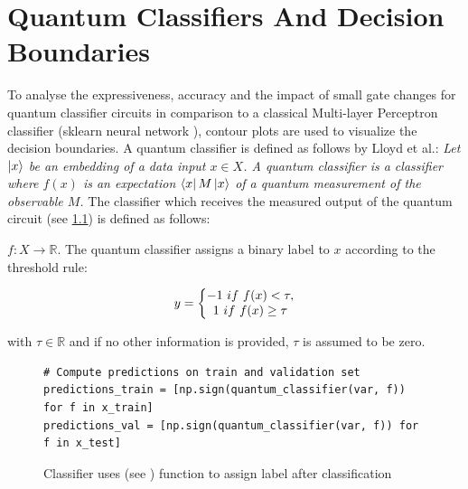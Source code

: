 
\chapter{Quantum Classifiers And Decision Boundaries} %

\label{chapter:quantum_classifiers_decision_boundaries}
To analyse the expressiveness, accuracy and the impact of small gate changes for quantum classifier circuits in comparison to a classical Multi-layer Perceptron classifier (sklearn neural network \href{https://scikit-learn.org/stable/modules/generated/sklearn.neural_network.MLPClassifier.html}{}), contour plots are used to visualize the decision boundaries. A quantum classifier is defined as follows by Lloyd et al.\cite{Quantum_embeddings_for_machine_learning_2020}: \textit{Let $\ket{x}$ be an embedding of a data input $x \in X$. A quantum classifier is a classifier where $f(x)$ is an expectation $\bra{x}M\ket{x}$ of a quantum measurement of the observable $M$.}
The classifier which receives the measured output of the quantum circuit (see \ref{fig:code_numpy_sign}) is defined as follows\cite{Quantum_embeddings_for_machine_learning_2020}:
\hfill \break

$f : X \rightarrow\mathbb{R}$. The quantum classifier assigns a binary label to $x$ according to the threshold rule:

\begin{equation}
    \centering
    \begin{split}
    y =
        \left\{\begin{matrix}
            -1\ if\ f(x) < \tau ,\\
            1\ if\ f(x) \geq \tau
        \end{matrix}\right.
    \end{split}
    \label{equation:classifier_definition}
\end{equation}

with $\tau\in\mathbb{R}$ and if no other information is provided, $\tau$ is assumed to be zero.\\
\hfill \break
\begin{figure}[h!]
    \centering
    \begin{verbatim}
# Compute predictions on train and validation set
predictions_train = [np.sign(quantum_classifier(var, f)) for f in x_train]
predictions_val = [np.sign(quantum_classifier(var, f)) for f in x_test]
    \end{verbatim}
    \caption{Classifier uses  (see \href{https://numpy.org/doc/stable/reference/generated/numpy.sign.html}{}) function to assign label after classification}
    \label{fig:code_numpy_sign}
\end{figure}

